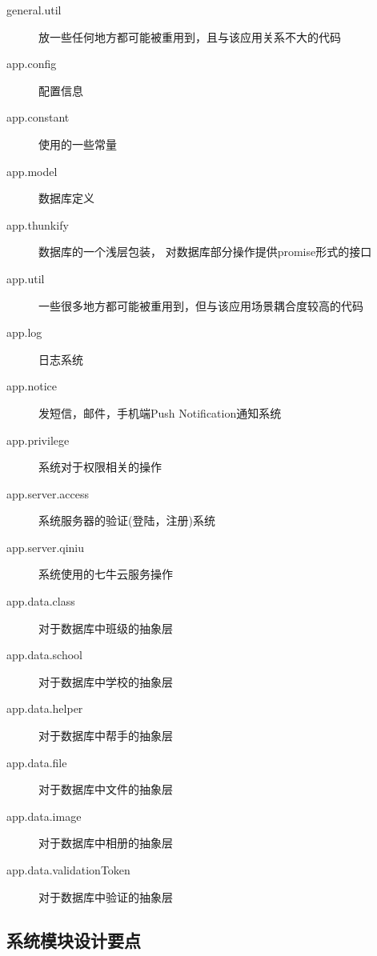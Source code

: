 \begin{description}
	\item[general.util] 放一些任何地方都可能被重用到，且与该应用关系不大的代码
	\item[app.config]  配置信息
	\item[app.constant] 使用的一些常量
	\item[app.model] 数据库定义
	\item[app.thunkify]   数据库的一个浅层包装， 对数据库部分操作提供promise形式的接口

	\item[app.util] 一些很多地方都可能被重用到，但与该应用场景耦合度较高的代码
	
	\item[app.log] 日志系统
	
	\item[app.notice] 发短信，邮件，手机端Push Notification通知系统
	
	\item[app.privilege] 系统对于权限相关的操作
	
	\item[app.server.access] 系统服务器的验证(登陆，注册)系统
	
	\item[app.server.qiniu] 系统使用的七牛云服务操作
	
	\item[app.data.class] 对于数据库中班级的抽象层
	
	\item[app.data.school] 对于数据库中学校的抽象层
	
	\item[app.data.helper] 对于数据库中帮手的抽象层
	
	\item[app.data.file] 对于数据库中文件的抽象层
	
	\item[app.data.image] 对于数据库中相册的抽象层
	
	\item[app.data.validationToken] 对于数据库中验证的抽象层
	
	
\end{description}



\subsection{系统模块设计要点}


